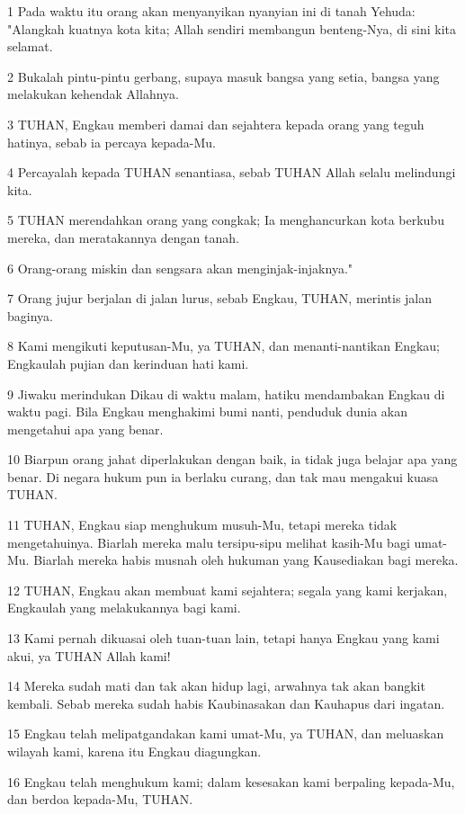 \par 1 Pada waktu itu orang akan menyanyikan nyanyian ini di tanah Yehuda: "Alangkah kuatnya kota kita; Allah sendiri membangun benteng-Nya, di sini kita selamat.
\par 2 Bukalah pintu-pintu gerbang, supaya masuk bangsa yang setia, bangsa yang melakukan kehendak Allahnya.
\par 3 TUHAN, Engkau memberi damai dan sejahtera kepada orang yang teguh hatinya, sebab ia percaya kepada-Mu.
\par 4 Percayalah kepada TUHAN senantiasa, sebab TUHAN Allah selalu melindungi kita.
\par 5 TUHAN merendahkan orang yang congkak; Ia menghancurkan kota berkubu mereka, dan meratakannya dengan tanah.
\par 6 Orang-orang miskin dan sengsara akan menginjak-injaknya."
\par 7 Orang jujur berjalan di jalan lurus, sebab Engkau, TUHAN, merintis jalan baginya.
\par 8 Kami mengikuti keputusan-Mu, ya TUHAN, dan menanti-nantikan Engkau; Engkaulah pujian dan kerinduan hati kami.
\par 9 Jiwaku merindukan Dikau di waktu malam, hatiku mendambakan Engkau di waktu pagi. Bila Engkau menghakimi bumi nanti, penduduk dunia akan mengetahui apa yang benar.
\par 10 Biarpun orang jahat diperlakukan dengan baik, ia tidak juga belajar apa yang benar. Di negara hukum pun ia berlaku curang, dan tak mau mengakui kuasa TUHAN.
\par 11 TUHAN, Engkau siap menghukum musuh-Mu, tetapi mereka tidak mengetahuinya. Biarlah mereka malu tersipu-sipu melihat kasih-Mu bagi umat-Mu. Biarlah mereka habis musnah oleh hukuman yang Kausediakan bagi mereka.
\par 12 TUHAN, Engkau akan membuat kami sejahtera; segala yang kami kerjakan, Engkaulah yang melakukannya bagi kami.
\par 13 Kami pernah dikuasai oleh tuan-tuan lain, tetapi hanya Engkau yang kami akui, ya TUHAN Allah kami!
\par 14 Mereka sudah mati dan tak akan hidup lagi, arwahnya tak akan bangkit kembali. Sebab mereka sudah habis Kaubinasakan dan Kauhapus dari ingatan.
\par 15 Engkau telah melipatgandakan kami umat-Mu, ya TUHAN, dan meluaskan wilayah kami, karena itu Engkau diagungkan.
\par 16 Engkau telah menghukum kami; dalam kesesakan kami berpaling kepada-Mu, dan berdoa kepada-Mu, TUHAN.
